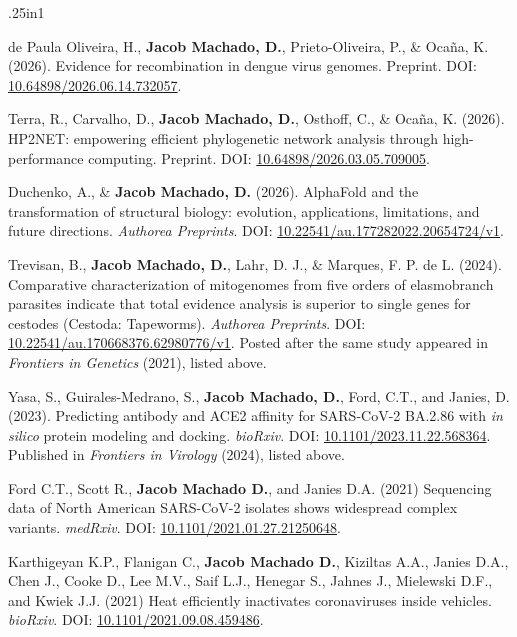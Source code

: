 \documentclass[11pt, letterpaper, sans]{moderncv}
\begin{document}
	{
		\setlength{\parskip}{.5em}\renewcommand{\baselinestretch}{2.0}
		\begin{hangparas}{.25in}{1}

        de Paula Oliveira, H., \textbf{Jacob Machado, D.}, Prieto-Oliveira, P., \& Ocaña, K. (2026). Evidence for recombination in dengue virus genomes. Preprint. DOI: \href{https://doi.org/10.64898/2026.06.14.732057}{10.64898/2026.06.14.732057}.

        Terra, R., Carvalho, D., \textbf{Jacob Machado, D.}, Osthoff, C., \& Ocaña, K. (2026). HP2NET: empowering efficient phylogenetic network analysis through high-performance computing. Preprint. DOI: \href{https://doi.org/10.64898/2026.03.05.709005}{10.64898/2026.03.05.709005}.

        Duchenko, A., \& \textbf{Jacob Machado, D.} (2026). AlphaFold and the transformation of structural biology: evolution, applications, limitations, and future directions. \textit{Authorea Preprints}. DOI: \href{https://doi.org/10.22541/au.177282022.20654724/v1}{10.22541/au.177282022.20654724/v1}.

        Trevisan, B., \textbf{Jacob Machado, D.}, Lahr, D. J., \& Marques, F. P. de L. (2024). Comparative characterization of mitogenomes from five orders of elasmobranch parasites indicate that total evidence analysis is superior to single genes for cestodes (Cestoda: Tapeworms). \textit{Authorea Preprints}. DOI: \href{https://doi.org/10.22541/au.170668376.62980776/v1}{10.22541/au.170668376.62980776/v1}. Posted after the same study appeared in \textit{Frontiers in Genetics} (2021), listed above.

		Yasa, S., Guirales-Medrano, S., \textbf{Jacob Machado, D.}, Ford, C.T., and Janies, D. (2023). Predicting antibody and ACE2 affinity for SARS-CoV-2 BA.2.86 with \textit{in silico} protein modeling and docking. \textit{bioRxiv}. DOI: \href{https://doi.org/10.1101/2023.11.22.568364}{10.1101/2023.11.22.568364}. Published in \textit{Frontiers in Virology} (2024), listed above.

		Ford C.T., Scott R.,  \textbf{Jacob Machado D.}, and  Janies D.A. (2021) Sequencing data of North American SARS-CoV-2 isolates shows widespread complex variants. \textit{medRxiv}. DOI: \href{https://doi.org/10.1101/2021.01.27.21250648}{10.1101/2021.01.27.21250648}.

		Karthigeyan K.P., Flanigan C., \textbf{Jacob Machado D.}, Kiziltas A.A., Janies D.A., Chen J., Cooke D., Lee M.V., Saif L.J., Henegar S., Jahnes J., Mielewski D.F., and Kwiek J.J. (2021) Heat efficiently inactivates coronaviruses inside vehicles. \textit{bioRxiv}. DOI: \href{https://doi.org/10.1101/2021.09.08.459486}{10.1101/2021.09.08.459486}.

		\end{hangparas}
	}
\end{document}

